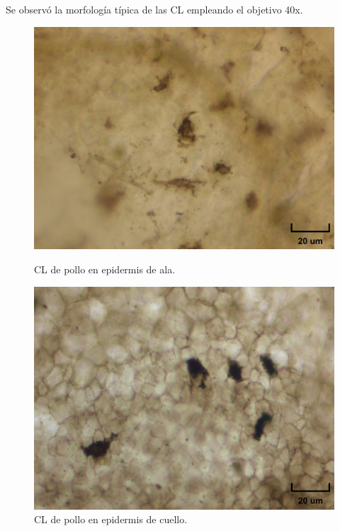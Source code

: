 \vspace{-0.5cm}

Se observó la morfología típica de las CL empleando el objetivo 40x.

\begin{figure}[h]
    \begin{minipage}[b]{0.225\textwidth}
        \centering
        \includegraphics[scale=0.29,frame]{CL1.jpg}
        \caption{\small{CL de pollo en epidermis de ala.}}
    \end{minipage}
    \hfill
    \begin{minipage}[b]{0.25\textwidth}
        \centering
        \includegraphics[scale=0.2725,frame]{CL2.jpg}
        \caption{\small{CL de pollo en epidermis de cuello.}}
    \end{minipage}
\end{figure}

